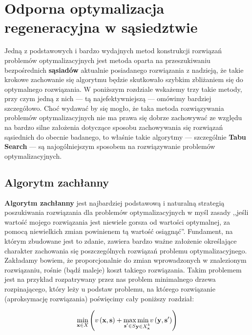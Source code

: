\chapter{Odporna optymalizacja regeneracyjna w sąsiedztwie}
\thispagestyle{chapterBeginStyle}

Jedną z podstawowych i bardzo wydajnych metod konstrukcji rozwiązań problemów optymalizacyjnych jest metoda oparta na przeszukiwaniu bezpośrednich \textbf{sąsiadów} aktualnie posiadanego rozwiązania z nadzieją, że takie krokowe zachowanie się algorytmu będzie skutkowało szybkim zbliżaniem się do optymalnego rozwiązania. W poniższym rozdziale wskażemy trzy takie metody, przy czym jedną z nich --- tą najefektywniejszą --- omówimy bardziej szczegółowo. Choć wydawać by się mogło, że taka metoda rozwiązywania problemów optymalizacyjnych nie ma prawa się dobrze zachowywać ze względu na bardzo silne założenia dotyczące sposobu zachowywania się rozwiązań sąsiednich do obecnie badanego, to właśnie takie algorytmy --- szczególnie \textbf{Tabu Search} --- są najogólniejszym sposobem na rozwiązywanie problemów optymalizacyjnych.

\section{Algorytm zachłanny}

\textbf{Algorytm zachłanny} jest najbardziej podstawową i naturalną strategią poszukiwania rozwiązania dla problemów optymalizacyjnych w myśl zasady ,,jeśli wartość mojego rozwiązania jest niewiele gorsza od wartości optymalnej, za pomocą niewielkich zmian powinienem tą wartość osiągnąć''. Fundament, na którym zbudowane jest to zdanie, zawiera bardzo ważne założenie określające charakter zachowania się poszczególnych rozwiązań problemu optymalizacyjnego. Zakładamy bowiem, że proporcjonalnie do zmian wprowadzonych w znalezionym rozwiązaniu, rośnie (bądź maleje) koszt takiego rozwiązania. Takim problemem jest na przykład rozpatrywany przez nas problem minimalnego drzewa rozpinającego, który leży u podstaw problemu, na którego rozwiązanie (aproksymację rozwiązania) poświęcimy cały poniższy rozdział:

\begin{equation}\label{eq:rrmst}
\min_{\mathclap{\textbf{x} \in X}} \left( v \left( \textbf{x}, \textbf{s} \right) + \max_{\mathclap{\textbf{s}^{\prime} \in S}} \min_{\mathclap{\textbf{y} \in X^{k}_{\textbf{x}}}} v \left( \textbf{y}, \textbf{s}^{\prime} \right) \right)
\end{equation}
\vspace*{-20pt}
